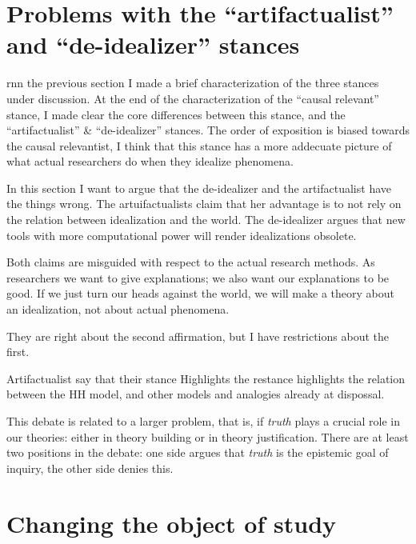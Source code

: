 \section{Problems with the ``artifactualist'' and ``de-idealizer'' stances}

rnn the previous section I made a brief characterization of the three stances under discussion.
At the end of the characterization of the ``causal relevant'' stance, I made clear the core differences between this stance, and the ``artifactualist'' \& ``de-idealizer'' stances.
The order of exposition is biased towards the causal relevantist, I think that this stance has a more addecuate picture of what actual researchers do when they idealize phenomena.

In this section I want to argue that the de-idealizer and the artifactualist have the things wrong.
The artuifactualists claim that her advantage is to not rely on the relation between idealization and the world.
The de-idealizer argues that new tools with more computational power will render idealizations obsolete.

Both claims are misguided with respect to the actual research methods.
As researchers we want to give explanations; we also want our explanations to be good.
If we just turn our heads against the world, we will make a theory about an idealization, not about actual phenomena.









They are right about the second affirmation, but I have restrictions about the first.



Artifactualist say that their stance Highlights the restance highlights the relation between the HH model, and other models and analogies already at dispossal.








This debate is related to a larger problem, that is, if \emph{truth} plays a crucial role in our theories: either in theory building or in theory justification.
There are at least two positions in the debate: one side argues that \emph{truth} is the epistemic goal of inquiry, the other side denies this.






\section{Changing the object of study}


